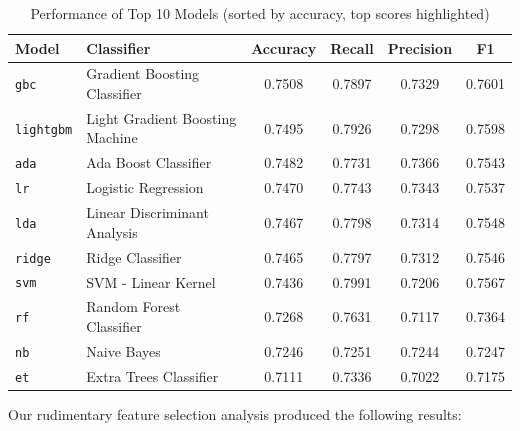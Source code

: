 \documentclass[a4paper,12pt]{article}
\begin{document}
\begin{table}[H]
    \centering
    \begin{tabular}{l l c c c c}
    \toprule
    \textbf{Model} & \textbf{Classifier} & \textbf{Accuracy} & \textbf{Recall} & \textbf{Precision} & \textbf{F1} \\
    \midrule
    \texttt{gbc} & Gradient Boosting Classifier & \cellcolor{yellow}0.7508 & 0.7897 & 0.7329 & \cellcolor{yellow}0.7601 \\
    \texttt{lightgbm} & Light Gradient Boosting Machine & 0.7495 & 0.7926 & 0.7298 & 0.7598 \\
    \texttt{ada} & Ada Boost Classifier & 0.7482 & 0.7731 & \cellcolor{yellow}0.7366 & 0.7543 \\
    \texttt{lr} & Logistic Regression & 0.7470 & 0.7743 & 0.7343 & 0.7537 \\
    \texttt{lda} & Linear Discriminant Analysis & 0.7467 & 0.7798 & 0.7314 & 0.7548 \\
    \texttt{ridge} & Ridge Classifier & 0.7465 & 0.7797 & 0.7312 & 0.7546 \\
    \texttt{svm} & SVM - Linear Kernel & 0.7436 & \cellcolor{yellow}0.7991 & 0.7206 & 0.7567 \\
    \texttt{rf} & Random Forest Classifier & 0.7268 & 0.7631 & 0.7117 & 0.7364 \\
    \texttt{nb} & Naive Bayes & 0.7246 & 0.7251 & 0.7244 & 0.7247 \\
    \texttt{et} & Extra Trees Classifier & 0.7111 & 0.7336 & 0.7022 & 0.7175 \\
    \bottomrule
    \end{tabular}
    \caption{Performance of Top 10 Models (sorted by accuracy, top scores highlighted)}
    \label{tab:model_performance}
    \end{table}
        
    

Our rudimentary feature selection analysis produced the following results:
\end{document}
